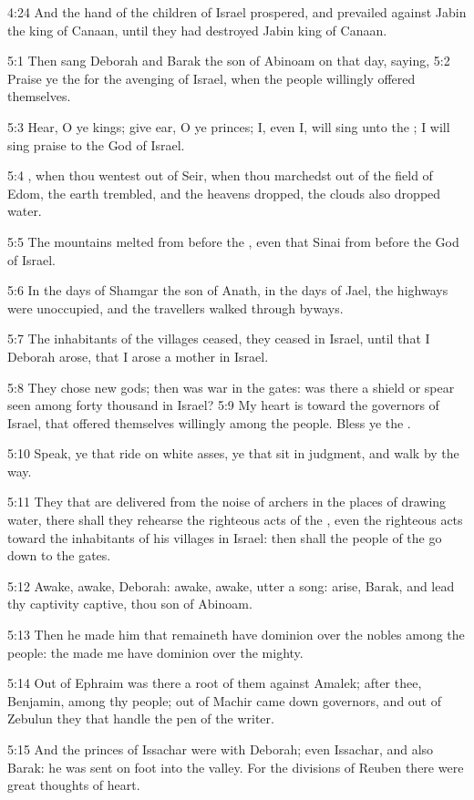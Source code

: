 4:24 And the hand of the children of Israel prospered, and prevailed against Jabin the king of Canaan, until they had destroyed Jabin king of Canaan.

5:1 Then sang Deborah and Barak the son of Abinoam on that day, saying, 5:2 Praise ye the \LORD for the avenging of Israel, when the people willingly offered themselves.

5:3 Hear, O ye kings; give ear, O ye princes; I, even I, will sing unto the \LORD; I will sing praise to the \LORD God of Israel.

5:4 \LORD, when thou wentest out of Seir, when thou marchedst out of the field of Edom, the earth trembled, and the heavens dropped, the clouds also dropped water.

5:5 The mountains melted from before the \LORD, even that Sinai from before the \LORD God of Israel.

5:6 In the days of Shamgar the son of Anath, in the days of Jael, the highways were unoccupied, and the travellers walked through byways.

5:7 The inhabitants of the villages ceased, they ceased in Israel, until that I Deborah arose, that I arose a mother in Israel.

5:8 They chose new gods; then was war in the gates: was there a shield or spear seen among forty thousand in Israel?  5:9 My heart is toward the governors of Israel, that offered themselves willingly among the people. Bless ye the \LORD.

5:10 Speak, ye that ride on white asses, ye that sit in judgment, and walk by the way.

5:11 They that are delivered from the noise of archers in the places of drawing water, there shall they rehearse the righteous acts of the \LORD, even the righteous acts toward the inhabitants of his villages in Israel: then shall the people of the \LORD go down to the gates.

5:12 Awake, awake, Deborah: awake, awake, utter a song: arise, Barak, and lead thy captivity captive, thou son of Abinoam.

5:13 Then he made him that remaineth have dominion over the nobles among the people: the \LORD made me have dominion over the mighty.

5:14 Out of Ephraim was there a root of them against Amalek; after thee, Benjamin, among thy people; out of Machir came down governors, and out of Zebulun they that handle the pen of the writer.

5:15 And the princes of Issachar were with Deborah; even Issachar, and also Barak: he was sent on foot into the valley. For the divisions of Reuben there were great thoughts of heart.

